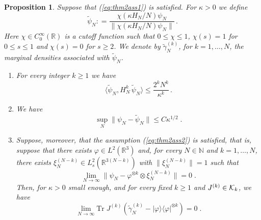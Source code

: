 \documentclass[11pt]{article}
\newtheorem{proposition}[theorem]{Proposition}
\newcommand{\ph}{\varphi}
\newcommand{\bR}{{\mathbb R}}
\newcommand{\bN}{{\mathbb N}}
\newcommand{\tr}{\mbox{Tr}}
\newcommand{\wt}{\widetilde}
\newcommand{\cK}{{\cal K}}
\begin{document}
\begin{proposition}\label{prop:initialdata}
Suppose that (\ref{eq:thm2ass1}) is satisfied. For $\kappa
>0$ we define
\begin{equation}\label{eq:wtpsi}
\wt \psi_N: = \frac{\chi ( \kappa H_N/N ) \psi_N}{\| \chi (\kappa
H_N/N) \psi_N \|} \, .
\end{equation}
Here $\chi \in C^{\infty}_0 ( \bR )$ is a cutoff function such that
$0\leq \chi\leq 1$, $\chi (s) =1$ for $0 \leq s \leq 1$ and $\chi
(s) =0$ for $s \geq 2$. We denote by $\wt \gamma^{(k)}_{N}$, for $k
=1, \dots, N$, the marginal densities associated with $\wt \psi_N$.
\begin{enumerate}
\item[i)] For every integer $k \geq 1$ we have
\begin{equation}
\langle \wt \psi_N , H_N^k \, \wt \psi_N \rangle \leq \frac{2^k
N^k}{\kappa^k}\,.
\end{equation}
\item[ii)] We have
\[ \sup_N \| \psi_N - \wt\psi_N \| \leq C \kappa^{1/2} \; .
\]
\item[iii)] Suppose, moreover, that the assumption (\ref{eq:thm2ass2}) is
satisfied, that is,  suppose that there exists $\ph \in L^2 (\bR^3)$
and, for every $N \in \bN$ and $k =1, \dots ,N$, there exists
$\xi^{(N-k)}_N \in L^2_s (\bR^{3(N-k)})$ with $\|\xi^{(N-k)}_N\| =1$
such that
\begin{equation}\label{eq:fact}
\lim_{N\to\infty}\| \psi_N - \ph^{\otimes k} \otimes \xi^{(N-k)}_N \| = 0\; .
\end{equation}
Then, for $\kappa >0$ small enough, and for every
fixed $k \geq 1$ and $J^{(k)} \in \cK_k$, we have
\begin{equation}\label{eq:init-3}
\lim_{N\to\infty}
\tr \; J^{(k)} \left( \wt \gamma^{(k)}_{N} - |\ph \rangle \langle
\ph|^{\otimes k} \right) = 0\; .
\end{equation}
\end{enumerate}
\end{proposition}
\end{document}
